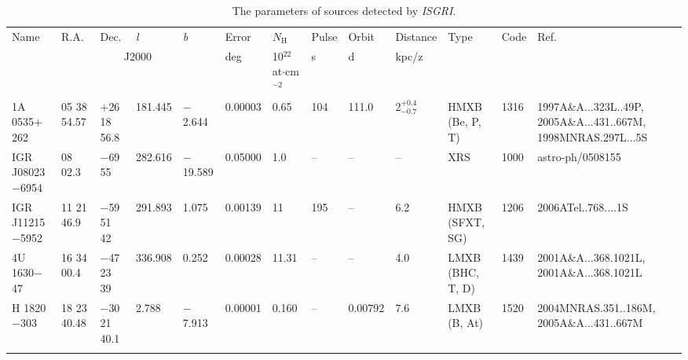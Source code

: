 \begin{table*}[p] \centering 
\label{tab_par} 
\caption{ The parameters of sources detected by \emph{ISGRI}.} 
\begin{scriptsize}
\begin{tabular}{lllllllllllll}
 Name & R.A. & Dec. & \emph{l} & \emph{b} & Error & $N_{\mathrm{H}}$ & Pulse & Orbit & Distance & Type & Code & Ref. \\
  & \multicolumn{4}{c}{J2000}  & deg & 10$^{22}$at$\cdot$cm$^{-2}$ & s & d & kpc/z &  &  &  \\
\noalign{\smallskip}
\noalign{\smallskip}
\hline
\hline
\noalign{\smallskip}
\noalign{\smallskip}
1A 0535$+$262 & 05 38 54.57 & $+$26 18 56.8 & 181.445 & $-$2.644 & 0.00003 & 0.65 & 104 & 111.0 & 2$_{-0.7}^{+0.4}$ & HMXB (Be, P, T) & 1316 & 1997A\&A...323L..49P, 2005A\&A...431..667M, 1998MNRAS.297L...5S \\ 
\noalign{\smallskip}
IGR J08023$-$6954 & 08 02.3 & $-$69 55 & 282.616 & $-$19.589 & 0.05000 & 1.0 & -- & -- & -- & XRS & 1000 & astro-ph/0508155 \\ 
\noalign{\smallskip}
IGR J11215$-$5952 & 11 21 46.9 & $-$59 51 42 & 291.893 & 1.075 & 0.00139 & 11 & 195 & -- & 6.2 & HMXB (SFXT, SG) & 1206 & 2006ATel..768....1S \\
\noalign{\smallskip}
4U 1630$-$47 & 16 34 00.4 & $-$47 23 39 & 336.908 & 0.252 & 0.00028 & 11.31 & -- & -- & 4.0 & LMXB (BHC, T, D) & 1439 & 2001A\&A...368.1021L, 2001A\&A...368.1021L \\
\noalign{\smallskip}
H 1820$-$303 & 18 23 40.48 & $-$30 21 40.1 & 2.788 & $-$7.913 & 0.00001 & 0.160 & -- & 0.00792 & 7.6 & LMXB (B, At) & 1520 & 2004MNRAS.351..186M, 2005A\&A...431..667M \\ 
\noalign{\smallskip}
\vspace{3mm}
\end{tabular}
\end{scriptsize}
\end{table*}
